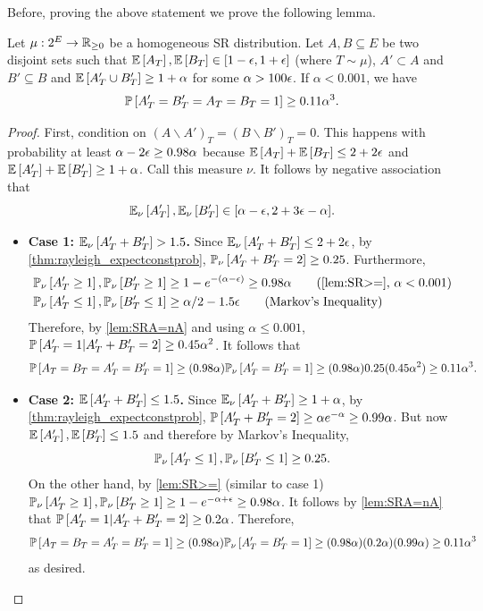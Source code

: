 Before, proving the above statement we prove the following lemma.
\begin{lemma}\label{lem:A'B'ABalpha}
Let $\mu:2^E \to\R_{\geq 0}$ be a homogeneous SR distribution. Let $A,B\subseteq E$ be two disjoint sets such that $ \E{A_T},\E{B_T} \in [1-\eps,1+\eps]$ (where $T\sim\mu$),  $A'\subset A$ and $B'\subseteq B$  and $\E{A'_T\cup B'_T}\geq 1+\alpha$ for some $\alpha>100\eps$. If $\alpha < 0.001$, we have
$$ \P{{A'_T}={B'_T}=A_T=B_T=1}\geq 0.11 \alpha^3.$$ 
\end{lemma}
\begin{proof}
	First, condition on $(A\smallsetminus A')_T=(B\smallsetminus B')_T=0$. This happens with probability at least $\alpha-2\eps \ge 0.98 \alpha$ because $\E{A_T}+\E{B_T}\leq 2+2\eps$ and $\E{A'_T}+\E{B'_T}\geq 1+\alpha$. Call this measure $\nu$. %
	It follows by negative association that  
	\begin{equation}\label{eq:ABpTflow} \EE{\nu}{A'_T},\EE{\nu}{B'_T}\in [\alpha-\eps, 2+3\eps - \alpha].	
 \end{equation}
	\begin{itemize}
	\item {\bf Case 1: $\EE{\nu}{A'_T+B'_T} > 1.5$.} 
Since $\EE{\nu}{A'_T+B'_T}\leq 2+2\eps$, by \cref{thm:rayleigh_expectconstprob}, 
$\PP{\nu}{A'_T+B'_T=2} \geq  0.25$.
Furthermore,
\begin{align*}
&\PP{\nu}{A'_T\geq 1},\PP{\nu}{B'_T\geq 1} \geq 1-e^{-(\alpha-\eps)}\geq 0.98\alpha \tag{\cref{lem:SR>=}, $\alpha<0.001$}\\
& \PP{\nu}{A'_T\leq 1},\PP{\nu}{B'_T\leq 1} \geq \alpha/2-1.5\eps	\tag{Markov's Inequality}
\end{align*}
Therefore, by \cref{lem:SRA=nA} and using $\alpha\leq 0.001$, $\P{A'_T=1 | A'_T+B'_T=2} \geq 0.45\alpha^2$.
It follows that 
$$\P{A_T=B_T=A'_T=B'_T=1} \geq (0.98\alpha)\PP{\nu}{A'_T=B'_T=1}\geq (0.98\alpha)0.25(0.45\alpha^2) \ge 0.11\alpha^3.$$

	\item {\bf Case 2: $\E{A'_T+B'_T}\leq 1.5$.}
Since $\EE{\nu}{A'_T+B'_T}\geq 1+\alpha$, by \cref{thm:rayleigh_expectconstprob},  $\P{A'_T+B'_T=2} \ge \alpha e^{-\alpha}\geq 0.99\alpha$. But now $\E{A'_T},\E{B'_T}\leq 1.5$ and therefore by Markov's Inequality, 
$$\PP{\nu}{A'_T\leq 1},\PP{\nu}{B'_T\leq 1}\geq 0.25.$$ 
On the other hand, by \cref{lem:SR>=} (similar to case 1) $\PP{\nu}{A'_T\geq 1},\PP{\nu}{B'_T\geq 1} \geq 1-e^{-\alpha+\eps}\geq 0.98\alpha$.
It follows by \cref{lem:SRA=nA} that 
$\P{A'_T=1 | A'_T+B'_T=2} \geq 0.2\alpha$.  Therefore,
$$ \P{A_T=B_T=A'_T=B'_T=1} \geq (0.98\alpha)\PP{\nu}{A'_T=B'_T=1}\geq (0.98\alpha)(0.2\alpha)(0.99\alpha)\geq 0.11\alpha^3$$
as desired.
	\end{itemize}
\end{proof}

